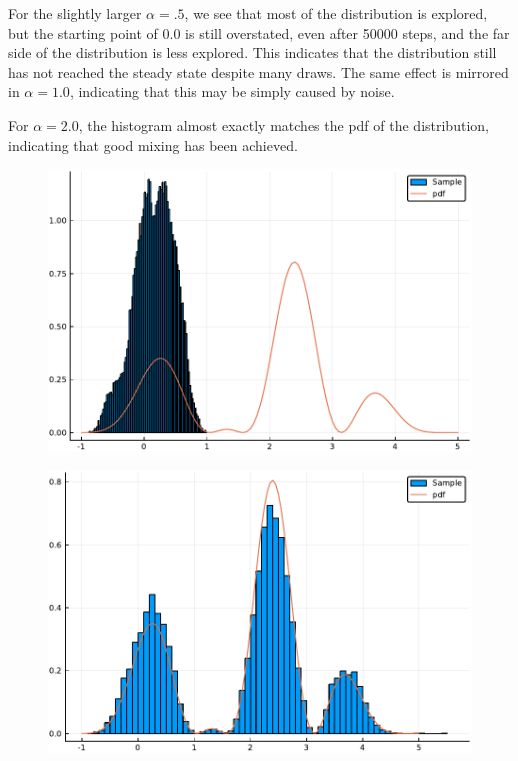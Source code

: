 \documentclass[12pt]{paper}
\begin{document}
For the slightly larger \(\alpha = .5\), we see that most of the distribution
is explored, but the starting point of \(0.0\) is still overstated, even
after 50000 steps, and the far side of the distribution is less
explored. This indicates that the distribution still has not reached
the steady state despite many draws. The same effect is mirrored in
\(\alpha= 1.0\), indicating that this may be simply caused by noise.

For \(\alpha = 2.0\), the histogram almost exactly matches the pdf of the
distribution, indicating that good mixing has been achieved. 

\begin{figure}[H]
\centering
\begin{minipage}{.5\textwidth}
  \centering
  \includegraphics[width=.8\linewidth]{pdf05.pdf}
  \label{fig:test3}
\end{minipage}%
\begin{minipage}{.5\textwidth}
  \centering
  \includegraphics[width=.8\linewidth]{pdf5.pdf}
  \label{fig:test4}
\end{minipage}
\end{figure}
\end{document}
